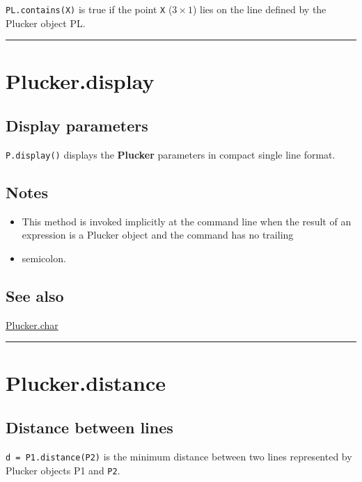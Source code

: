 \texttt{PL.contains(X)} is true if the point \texttt{X} ($3 \times 1$) lies on the line defined by
the Plucker object PL.

\vspace{1.5ex}\hrule

\hypertarget{Plucker.display}{\section*{Plucker.display}}
\subsection*{Display parameters}


\texttt{P.display()} displays the \textbf{\color{red} Plucker} parameters in compact single line format.


\subsection*{Notes}
\begin{itemize}
  \item This method is invoked implicitly at the command line when the result     of an expression is a Plucker object and the command has no trailing
  \item semicolon.
\end{itemize}

\subsection*{See also}


\hyperlink{Plucker.char}{\color{blue} Plucker.char}

\vspace{1.5ex}\hrule

\hypertarget{Plucker.distance}{\section*{Plucker.distance}}
\subsection*{Distance between lines}


\texttt{d = P1.distance(P2)} is the minimum distance between two lines represented
by Plucker objects P1 and \texttt{P2}.


